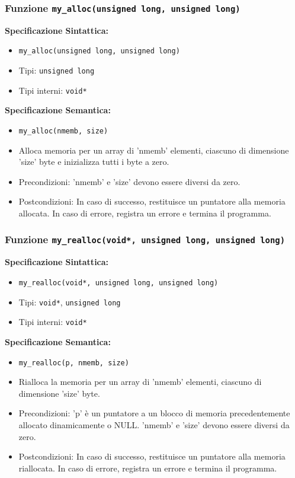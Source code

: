 \documentclass[11pt]{scrartcl} %
\begin{document}
\subsubsection{Funzione \texttt{my\_alloc(unsigned long, unsigned long)}}

\textbf{Specificazione Sintattica:}
\begin{itemize}
	\item \texttt{my\_alloc(unsigned long, unsigned long)}
	\item Tipi: \texttt{unsigned long}
	\item Tipi interni: \texttt{void*}
\end{itemize}

\textbf{Specificazione Semantica:}
\begin{itemize}
	\item \texttt{my\_alloc(nmemb, size)}
	\item Alloca memoria per un array di 'nmemb' elementi, ciascuno di dimensione 'size' byte e inizializza tutti i byte a zero.
	\item Precondizioni: 'nmemb' e 'size' devono essere diversi da zero.
	\item Postcondizioni: In caso di successo, restituisce un puntatore alla memoria allocata. In caso di errore, registra un errore e termina il programma.
\end{itemize}

\subsubsection{Funzione \texttt{my\_realloc(void*, unsigned long, unsigned long)}}

\textbf{Specificazione Sintattica:}
\begin{itemize}
	\item \texttt{my\_realloc(void*, unsigned long, unsigned long)}
	\item Tipi: \texttt{void*}, \texttt{unsigned long}
	\item Tipi interni: \texttt{void*}
\end{itemize}

\textbf{Specificazione Semantica:}
\begin{itemize}
	\item \texttt{my\_realloc(p, nmemb, size)}
	\item Rialloca la memoria per un array di 'nmemb' elementi, ciascuno di dimensione 'size' byte.
	\item Precondizioni: 'p' è un puntatore a un blocco di memoria precedentemente allocato dinamicamente o NULL. 'nmemb' e 'size' devono essere diversi da zero.
	\item Postcondizioni: In caso di successo, restituisce un puntatore alla memoria riallocata. In caso di errore, registra un errore e termina il programma.
\end{itemize}
\end{document}
